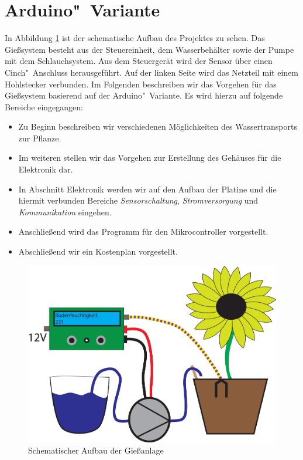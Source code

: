 \section{Arduino"~Variante}

In Abbildung \ref{fig-SchemaAufbau} ist der schematische Aufbau des Projektes zu sehen. Das Gießsystem besteht aus der Steuereinheit, dem Wasserbehälter sowie der Pumpe mit dem Schlauchsystem. Aus dem Steuergerät wird der Sensor über einen Cinch"~Anschluss herausgeführt. Auf der linken Seite wird das Netzteil mit einem Hohlstecker verbunden. 
Im Folgenden beschreiben wir das Vorgehen für das Gießsystem basierend auf der Arduino"~Variante. 
Es wird hierzu auf folgende Bereiche eingegangen:

\begin{itemize}
	\item Zu Beginn beschreiben wir verschiedenen Möglichkeiten des Wassertransports zur Pflanze.
	\item Im weiteren stellen wir das Vorgehen zur Erstellung des Gehäuses für die Elektronik dar.
	\item In Abschnitt Elektronik werden wir auf den Aufbau der Platine und die hiermit verbunden Bereiche \emph{Sensorschaltung}, \emph{Stromversorgung} und \emph{Kommunikation} eingehen.
	\item Anschließend wird das Programm für den Mikrocontroller vorgestellt.
	\item Abschließend wir ein Kostenplan vorgestellt. 
	
\end{itemize}

	\begin{figure}[ht]
	\centering
	\includegraphics[width=0.9\linewidth]{bilder/Bild_Aufbau.eps}	
	\caption{Schematischer Aufbau der Gießanlage}
	\label{fig-SchemaAufbau}
	\end{figure}

